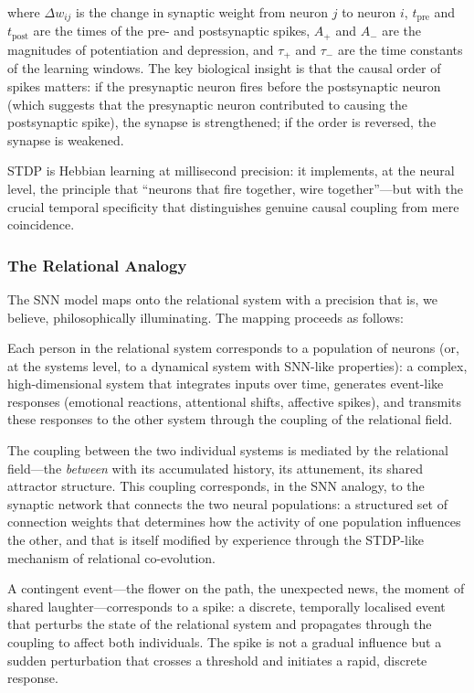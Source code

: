 where $\Delta w_{ij}$ is the change in synaptic weight from neuron $j$ to neuron $i$, $t_{\mathrm{pre}}$ and $t_{\mathrm{post}}$ are the times of the pre- and postsynaptic spikes, $A_+$ and $A_-$ are the magnitudes of potentiation and depression, and $\tau_+$ and $\tau_-$ are the time constants of the learning windows. The key biological insight is that the causal order of spikes matters: if the presynaptic neuron fires before the postsynaptic neuron (which suggests that the presynaptic neuron contributed to causing the postsynaptic spike), the synapse is strengthened; if the order is reversed, the synapse is weakened.

STDP is Hebbian learning at millisecond precision: it implements, at the neural level, the principle that ``neurons that fire together, wire together''---but with the crucial temporal specificity that distinguishes genuine causal coupling from mere coincidence.

\subsubsection{The Relational Analogy}
\label{p14:subsubsec:analogy}

\noindent
The SNN model maps onto the relational system with a precision that is, we believe, philosophically illuminating. The mapping proceeds as follows:

 Each person in the relational system corresponds to a population of neurons (or, at the systems level, to a dynamical system with SNN-like properties): a complex, high-dimensional system that integrates inputs over time, generates event-like responses (emotional reactions, attentional shifts, affective spikes), and transmits these responses to the other system through the coupling of the relational field.

 The coupling between the two individual systems is mediated by the relational field---the \emph{between} with its accumulated history, its attunement, its shared attractor structure. This coupling corresponds, in the SNN analogy, to the synaptic network that connects the two neural populations: a structured set of connection weights that determines how the activity of one population influences the other, and that is itself modified by experience through the STDP-like mechanism of relational co-evolution.

 A contingent event---the flower on the path, the unexpected news, the moment of shared laughter---corresponds to a spike: a discrete, temporally localised event that perturbs the state of the relational system and propagates through the coupling to affect both individuals. The spike is not a gradual influence but a sudden perturbation that crosses a threshold and initiates a rapid, discrete response.

